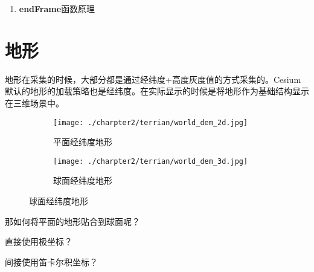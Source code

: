 \begin{enumerate}
\begin{enumerate}
\begin{enumerate}
			            \item \textbf{endFrame}函数原理
		            \end{enumerate}
	      \end{enumerate}
\end{enumerate}

\section{地形}
\label{sec:cesium-terrain}
地形在采集的时候，大部分都是通过经纬度+高度灰度值的方式采集的。Cesium默认的地形的加载策略也是经纬度。在实际显示的时候是将地形作为基础结构显示在三维场景中。
\begin{figure}[!htb]
	\centering
	\begin{subfigure}[b]{0.58\textwidth}
        \texttt{[image: ./charpter2/terrian/world\_dem\_2d.jpg]}
        \caption{平面经纬度地形}
        \label{fig:world_dem_2d}
    \end{subfigure}
    \begin{subfigure}[b]{0.3\textwidth}
		\texttt{[image: ./charpter2/terrian/world\_dem\_3d.jpg]}	
        \caption{球面经纬度地形}
        \label{fig:world_dem_3d}
    \end{subfigure}
\end{figure}

\begin{introduction}
	\item 那如何将平面的地形贴合到球面呢？
	\item 直接使用极坐标？
	\item 间接使用笛卡尔积坐标？
\end{introduction}

